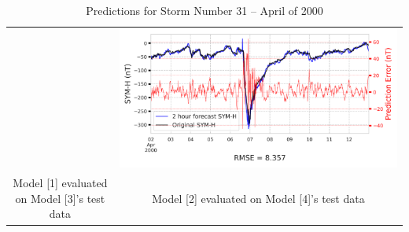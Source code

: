 \documentclass[draft,sw]{agutexSI2019}
\begin{document}
\begin{table}
\begin{tabular}{cc}
&
\includegraphics[width=0.49\linewidth]{paper_plots/2h_swics_model_on_no_swics/2h_swics_model_on_no_swics_storm_31.png}
\\
Model [1] evaluated on Model [3]'s test data & Model [2] evaluated on Model [4]'s test data
\vspace*{12pt}
\\
\end{tabular}
\caption{Predictions for Storm Number 31 -- April of 2000}
\label{storm-31}
\end{table}
\end{document}
